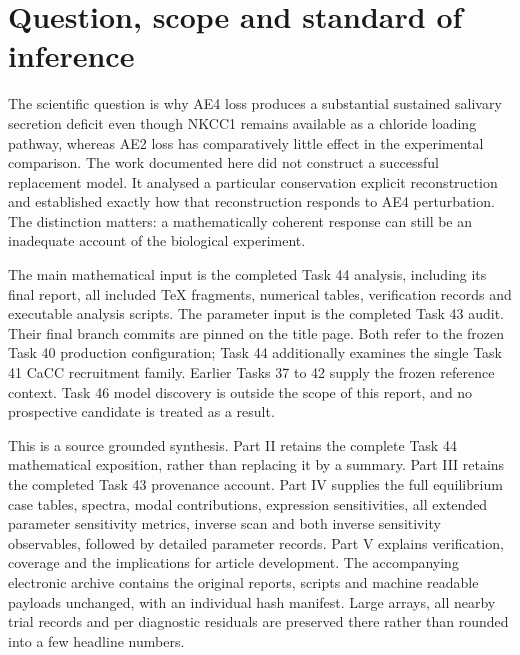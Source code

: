 \section{Question, scope and standard of inference}
\label{sec:report-scope}
The scientific question is why AE4 loss produces a substantial sustained salivary secretion deficit even though NKCC1 remains available as a chloride loading pathway, whereas AE2 loss has comparatively little effect in the experimental comparison. The work documented here did not construct a successful replacement model. It analysed a particular conservation explicit reconstruction and established exactly how that reconstruction responds to AE4 perturbation. The distinction matters: a mathematically coherent response can still be an inadequate account of the biological experiment.

The main mathematical input is the completed Task 44 analysis, including its final report, all included TeX fragments, numerical tables, verification records and executable analysis scripts. The parameter input is the completed Task 43 audit. Their final branch commits are pinned on the title page. Both refer to the frozen Task 40 production configuration; Task 44 additionally examines the single Task 41 CaCC recruitment family. Earlier Tasks 37 to 42 supply the frozen reference context. Task 46 model discovery is outside the scope of this report, and no prospective candidate is treated as a result.

This is a source grounded synthesis. Part II retains the complete Task 44 mathematical exposition, rather than replacing it by a summary. Part III retains the completed Task 43 provenance account. Part IV supplies the full equilibrium case tables, spectra, modal contributions, expression sensitivities, all extended parameter sensitivity metrics, inverse scan and both inverse sensitivity observables, followed by detailed parameter records. Part V explains verification, coverage and the implications for article development. The accompanying electronic archive contains the original reports, scripts and machine readable payloads unchanged, with an individual hash manifest. Large arrays, all nearby trial records and per diagnostic residuals are preserved there rather than rounded into a few headline numbers.

